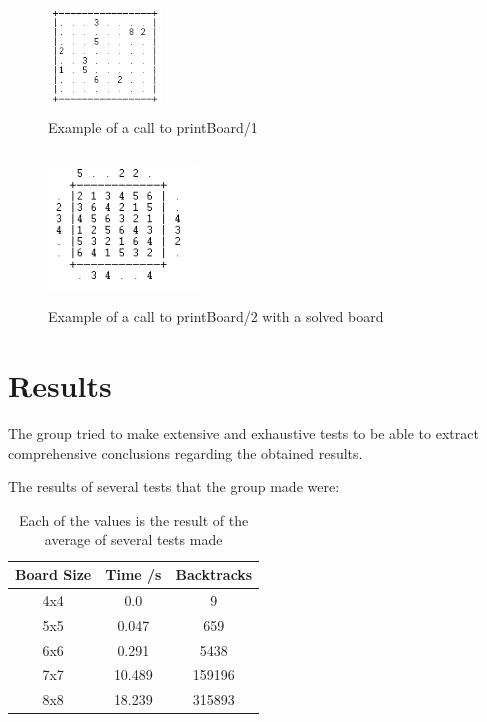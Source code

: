 \documentclass{llncs}
\begin{document}
\begin{figure}[h!]
\begin{center}
\includegraphics[height=3cm,width=3cm]{images/printBoard1.png}
\caption{Example of a call to printBoard/1}
\label{Figure 3}
\end{center}
\end{figure}

\begin{figure}[h!]
\begin{center}
\includegraphics[height=4cm,width=4cm]{images/printBoard21.png}
\caption{Example of a call to printBoard/2 with a solved board}
\label{Figure 4}
\end{center}
\end{figure}

%
\section{Results}

The group tried to make extensive and exhaustive tests to be able to extract comprehensive conclusions regarding the obtained results.

The results of several tests that the group made were:

\begin{table}[]
\centering
\caption{Each of the values is the result of the average of several tests made}
\label{Results Tablel}
\begin{tabular}{@{}ccc@{}}
\toprule
\multicolumn{1}{c|}{\textbf{Board Size}} & \multicolumn{1}{c|}{\textbf{Time /s}} & \textbf{Backtracks} \\ \midrule
4x4                                      & 0.0                                 & 9                   \\ \midrule
5x5                                      & 0.047                                 & 659                 \\ \midrule
6x6                                      & 0.291                                 & 5438                \\ \midrule
7x7                                      & 10.489                                & 159196              \\ \midrule
8x8                                      & 18.239                                & 315893              \\ \bottomrule
\end{tabular}
\end{table}
\end{document}
